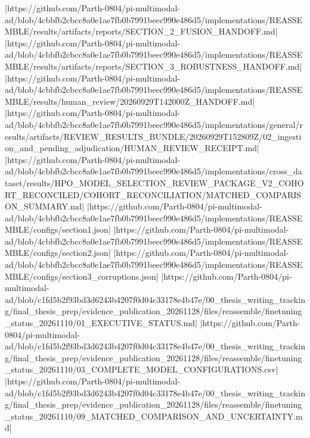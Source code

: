 |https://github.com/Parth-0804/pi-multimodal-ad/blob/4cbbfb2cbcc8a0e1ae7fb0b7991beec990e486d5/implementations/REASSEMBLE/results/artifacts/reports/SECTION_2_FUSION_HANDOFF.md|
|https://github.com/Parth-0804/pi-multimodal-ad/blob/4cbbfb2cbcc8a0e1ae7fb0b7991beec990e486d5/implementations/REASSEMBLE/results/artifacts/reports/SECTION_3_ROBUSTNESS_HANDOFF.md|
|https://github.com/Parth-0804/pi-multimodal-ad/blob/4cbbfb2cbcc8a0e1ae7fb0b7991beec990e486d5/implementations/REASSEMBLE/results/human_review/20260929T142000Z_HANDOFF.md|
|https://github.com/Parth-0804/pi-multimodal-ad/blob/4cbbfb2cbcc8a0e1ae7fb0b7991beec990e486d5/implementations/general/results/artifacts/REVIEW_RESULTS_BUNDLE/20260929T152809Z/02_ingestion_and_pending_adjudication/HUMAN_REVIEW_RECEIPT.md|
|https://github.com/Parth-0804/pi-multimodal-ad/blob/4cbbfb2cbcc8a0e1ae7fb0b7991beec990e486d5/implementations/cross_dataset/results/HPO_MODEL_SELECTION_REVIEW_PACKAGE_V2_COHORT_RECONCILED/COHORT_RECONCILIATION/MATCHED_COMPARISON_SUMMARY.md|
|https://github.com/Parth-0804/pi-multimodal-ad/blob/4cbbfb2cbcc8a0e1ae7fb0b7991beec990e486d5/implementations/REASSEMBLE/configs/section1.json|
|https://github.com/Parth-0804/pi-multimodal-ad/blob/4cbbfb2cbcc8a0e1ae7fb0b7991beec990e486d5/implementations/REASSEMBLE/configs/section2.json|
|https://github.com/Parth-0804/pi-multimodal-ad/blob/4cbbfb2cbcc8a0e1ae7fb0b7991beec990e486d5/implementations/REASSEMBLE/configs/section3_corruptions.json|
|https://github.com/Parth-0804/pi-multimodal-ad/blob/c1fd5b2f93bd3d6243b4207f0d04c33178e4b47e/00_thesis_writing_tracking/final_thesis_prep/evidence_publication_20261128/files/reassemble/finetuning_status_20261110/01_EXECUTIVE_STATUS.md|
|https://github.com/Parth-0804/pi-multimodal-ad/blob/c1fd5b2f93bd3d6243b4207f0d04c33178e4b47e/00_thesis_writing_tracking/final_thesis_prep/evidence_publication_20261128/files/reassemble/finetuning_status_20261110/03_COMPLETE_MODEL_CONFIGURATIONS.csv|
|https://github.com/Parth-0804/pi-multimodal-ad/blob/c1fd5b2f93bd3d6243b4207f0d04c33178e4b47e/00_thesis_writing_tracking/final_thesis_prep/evidence_publication_20261128/files/reassemble/finetuning_status_20261110/09_MATCHED_COMPARISON_AND_UNCERTAINTY.md|
